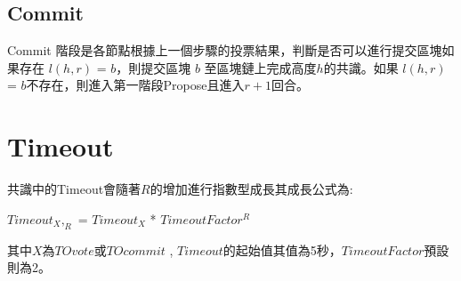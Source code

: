 \subsection{Commit}\label{se_3}
Commit 階段是各節點根據上一個步驟的投票結果，判斷是否可以進行提交區塊如果存在 $l(h,r)$ = $b$，則提交區塊 $b$ 至區塊鏈上完成高度$h$的共識。如果 $l(h,r)$ = $b$不存在，則進入第一階段Propose且進入$r+1$回合。

\section{Timeout}\label{se_3}

共識中的Timeout會隨著$R$的增加進行指數型成長其成長公式為: 

$Timeout_X,_R$ = $Timeout_X$ * $TimeoutFactor^R$

其中$X$為$TOvote$或$TOcommit$ , $Timeout$的起始值其值為5秒，$TimeoutFactor$預設則為2。 


